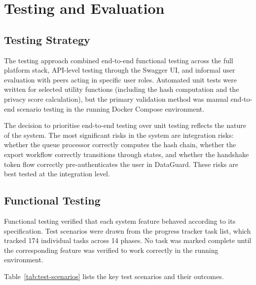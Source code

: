 \documentclass[a4paper,12pt,onecolumn]{report}
\begin{document}
\chapter{Testing and Evaluation}

\section{Testing Strategy}

The testing approach combined end-to-end functional testing across the full platform stack, API-level testing through the Swagger UI, and informal user evaluation with peers acting in specific user roles.
Automated unit tests were written for selected utility functions (including the hash computation and the privacy score calculation), but the primary validation method was manual end-to-end scenario testing in the running Docker Compose environment.

The decision to prioritise end-to-end testing over unit testing reflects the nature of the system.
The most significant risks in the system are integration risks: whether the queue processor correctly computes the hash chain, whether the export workflow correctly transitions through states, and whether the handshake token flow correctly pre-authenticates the user in DataGuard.
These risks are best tested at the integration level.

\section{Functional Testing}

Functional testing verified that each system feature behaved according to its specification.
Test scenarios were drawn from the progress tracker task list, which tracked 174 individual tasks across 14 phases.
No task was marked complete until the corresponding feature was verified to work correctly in the running environment.

Table~\ref{tab:test-scenarios} lists the key test scenarios and their outcomes.
\end{document}
